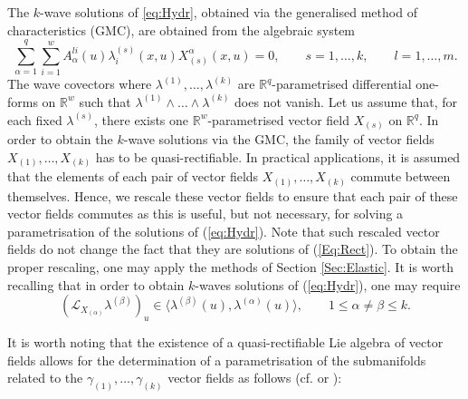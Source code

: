 \documentclass[12pt]{article}
\theoremstyle{plain}
\theoremstyle{definition}
\numberwithin{equation}{section}
\begin{document}
 The $k$-wave solutions of \eqref{eq:Hydr}, obtained via the generalised method of characteristics (GMC), are obtained from the algebraic system
\begin{equation}\label{Eq:Rect}
	\sum_{\alpha=1}^q\sum_{i=1}^wA^{li}_\alpha (u)\lambda^{(s)}_i(x,u)X^\alpha_{(s)}(x,u)=0,\qquad s=1,\ldots,k,\qquad l=1,\ldots,m.
\end{equation}
The wave covectors 
where $\lambda^{(1)},\ldots,\lambda^{(k)}$ are $\mathbb{R}^q$-parametrised differential one-forms on $\mathbb{R}^w$ such that $\lambda^{(1)}\wedge\ldots\wedge\lambda^{(k)}$ does not vanish. Let us assume that, for each fixed $\lambda^{(s)}$, there exists one $\mathbb{R}^w$-parametrised vector field $X_{(s)}$ on $\mathbb{R}^q$.  %
In order to obtain the $k$-wave solutions via the GMC, the family of vector fields $X_{(1)},\ldots,X_{(k)}$ has to be quasi-rectifiable. In practical applications, it is assumed that the elements of each pair of vector fields $X_{(1)},\ldots,X_{(k)}$ commute  between themselves. Hence, we rescale these vector fields to ensure that each pair of these vector fields commutes as this is useful, but not necessary, for solving a parametrisation of the solutions of (\ref{eq:Hydr}). Note that such rescaled vector fields do not change the fact that they are solutions of (\ref{Eq:Rect}). To obtain the proper rescaling, one may apply the methods of Section \ref{Sec:Elastic}. It is worth recalling that in order to obtain $k$-waves solutions of (\ref{eq:Hydr}), one may require
$$
(\mathcal{L}_{X_{(\alpha)}}\lambda^{{(\beta)}})_u\in \langle \lambda^{(\beta)}(u),\lambda^{(\alpha)}(u)\rangle,\qquad 1\leq \alpha\neq \beta\leq k.
$$

It is worth noting that the existence of a quasi-rectifiable Lie algebra of vector fields allows for the determination of a parametrisation of the submanifolds related to the $\gamma_{(1)},\ldots,\gamma_{(k)}$ vector fields as follows (cf. \cite[Section 11]{GT96} or \cite[eq. (2.3)]{GZ83b}):
\end{document}
